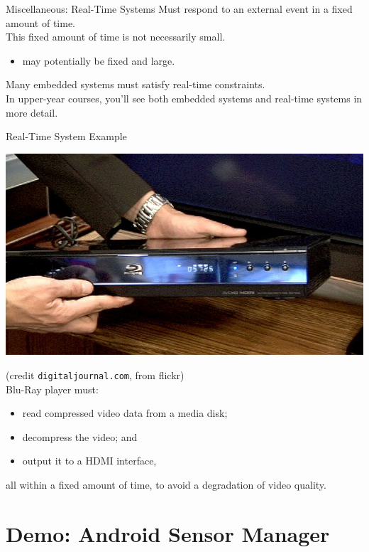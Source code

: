 \documentclass[aspectratio=169]{beamer}
\begin{document}
\begin{frame}{Miscellaneous: Real-Time Systems}
Must respond to an external event in a fixed amount of time. \\[1em]

This fixed amount of time is not necessarily small.
\begin{itemize}
\item may potentially be fixed and large.
\end{itemize}

Many embedded systems must satisfy real-time constraints.\\[1em]

In upper-year courses, you'll see both embedded systems and real-time
systems in more detail.

\end{frame}



\begin{frame}{Real-Time System Example}
\begin{center}
\includegraphics[height=0.4\textheight]{img/bluray}
\end{center}
\hfill {\tiny (credit {\tt digitaljournal.com}, from flickr)} \\
Blu-Ray player must:
\begin{itemize}
\item read compressed video data from a media disk;
\item decompress the video; and
\item output it to a HDMI interface,
\end{itemize}
all within a fixed amount of time, to avoid a degradation of video quality.
\end{frame}


\section*{Demo: Android Sensor Manager}
\end{document}
